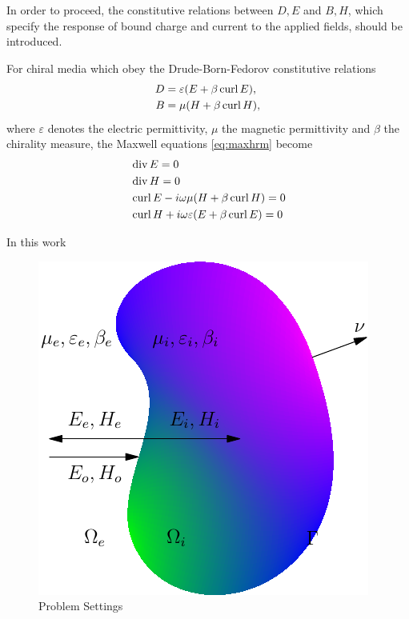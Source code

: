 In order to proceed, the constitutive relations between $D, E$ and $B, H$, which specify the response of bound charge and current to the applied fields, should be introduced. 

For chiral media which obey the Drude-Born-Fedorov constitutive relations
\begin{equation}
\begin{split}\label{eq:born}
  D &= \varepsilon(E + \beta\operatorname{curl} E), \\
  B &= \mu(H + \beta\operatorname{curl} H),
\end{split}
\end{equation}
where $\varepsilon$ denotes the electric permittivity, $\mu$ the magnetic permittivity and $\beta$ the chirality measure, the Maxwell equations \eqref{eq:maxhrm} become
\begin{equation}\label{eq:maxcnoh}
\begin{split}
  &\operatorname{div} E = 0 \\
  &\operatorname{div} H = 0 \\
  &\operatorname{curl} E - i\omega\mu(H+\beta\operatorname{curl} H) = 0\\
  &\operatorname{curl} H + i\omega\varepsilon(E+\beta\operatorname{curl} E) = 0
\end{split}
\end{equation}

In this work
\begin{figure}
\centering
  \includegraphics{fig1.pdf}
  \caption{Problem Settings}  
\label{fig:1}
\end{figure}

